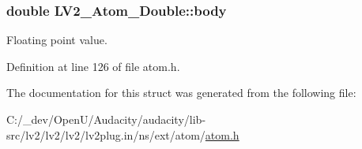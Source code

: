 \subsubsection[{\texorpdfstring{body}{body}}]{\setlength{\rightskip}{0pt plus 5cm}double L\+V2\+\_\+\+Atom\+\_\+\+Double\+::body}\hypertarget{struct_l_v2___atom___double_a5db15f75b7e939fa413843f99664e3ee}{}\label{struct_l_v2___atom___double_a5db15f75b7e939fa413843f99664e3ee}
Floating point value. 

Definition at line 126 of file atom.\+h.



The documentation for this struct was generated from the following file\+:\begin{DoxyCompactItemize}
\item 
C\+:/\+\_\+dev/\+Open\+U/\+Audacity/audacity/lib-\/src/lv2/lv2/lv2/lv2plug.\+in/ns/ext/atom/\hyperlink{atom_8h}{atom.\+h}\end{DoxyCompactItemize}
